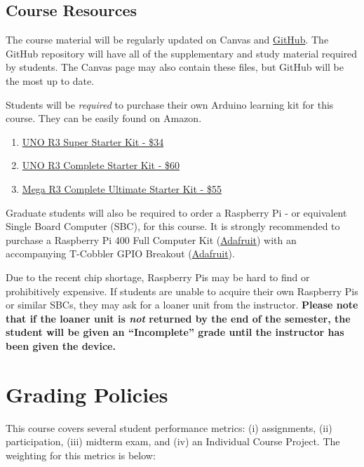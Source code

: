     \subsection*{Course Resources}
    The course material will be regularly updated on Canvas and \href{https://github.com/Legohead259/OCE4531-Material} {GitHub}. The GitHub repository will have all of the supplementary and study material required by students. The Canvas page may also contain these files, but GitHub will be the most up to date.
    
    Students will be \emph{required} to purchase their own Arduino learning kit for this course. They can be easily found on Amazon.
    
    \begin{enumerate}
        \item \href{https://www.amazon.com/ELEGOO-Project-Tutorial-Controller-Projects/dp/B01D8KOZF4}
        {UNO R3 Super Starter Kit - \$34}
        \item \href{https://www.amazon.com/EL-KIT-001-Project-Complete-Starter-Tutorial/dp/B01CZTLHGE} 
        {UNO R3 Complete Starter Kit - \$60}
        \item \href{https://www.amazon.com/EL-KIT-008-Project-Complete-Ultimate-TUTORIAL/dp/B01EWNUUUA}
        {Mega R3 Complete Ultimate Starter Kit - \$55}
    \end{enumerate}

    Graduate students will also be required to order a Raspberry Pi - or equivalent Single Board Computer (SBC), for this course. 
    It is strongly recommended to purchase a Raspberry Pi 400 Full Computer Kit (\href{https://www.adafruit.com/product/4796}{Adafruit}) with an accompanying T-Cobbler GPIO Breakout (\href{https://www.adafruit.com/product/2028}{Adafruit}).
    
    Due to the recent chip shortage, Raspberry Pis may be hard to find or prohibitively expensive. If students are unable to acquire their own Raspberry Pis or similar SBCs, they may ask for a loaner unit from the instructor. \textbf{Please note that if the loaner unit is \emph{not} returned by the end of the semester, the student will be given an ``Incomplete'' grade until the instructor has been given the device.}

\pagebreak

\section*{Grading Policies}
This course covers several student performance metrics: (i) assignments, (ii) participation, (iii) midterm exam, and (iv) an Individual Course Project. The weighting for this metrics is below:

